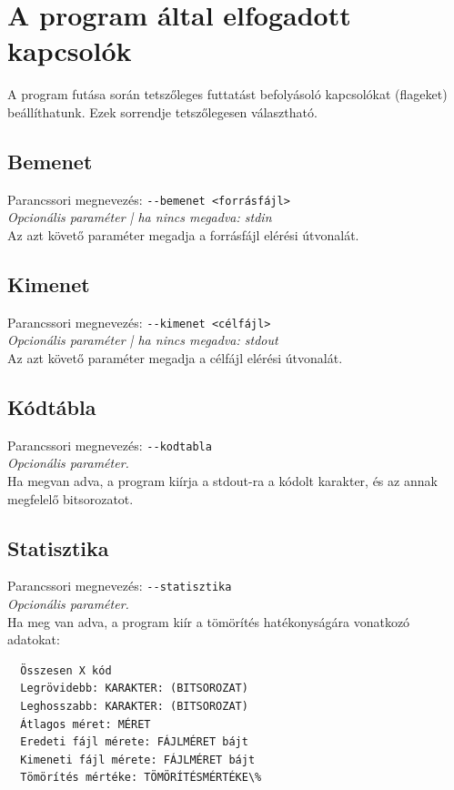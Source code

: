 \let\mypdfximage\pdfximage\def\pdfximage{\immediate\mypdfximage}\documentclass[twoside]{book}
\newcommand{\+}{\discretionary{\mbox{\scriptsize$\hookleftarrow$}}{}{}}
\begin{document}
\newpage
\section{A program által elfogadott kapcsolók}
\label{sec:flags}
A program futása során tetszőleges futtatást befolyásoló kapcsolókat (flageket) beállíthatunk.
Ezek sorrendje tetszőlegesen választható.
\subsection{Bemenet}
\label{ssec:in}
Parancssori megnevezés: \texttt{-{}-bemenet <forrásfájl>} \\
{\it Opcionális paraméter | ha nincs megadva: stdin}\\
Az azt követő paraméter megadja a forrásfájl elérési útvonalát.

\subsection{Kimenet}
\label{ssec:out}
Parancssori megnevezés: \texttt{-{}-kimenet <célfájl>} \\
{\it Opcionális paraméter | ha nincs megadva: stdout}\\
Az azt követő paraméter megadja a célfájl elérési útvonalát.

\subsection{Kódtábla}
Parancssori megnevezés: \texttt{-{}-kodtabla} \\
{\it Opcionális paraméter.}\\
Ha megvan adva, a program kiírja a stdout-ra a kódolt karakter, és az annak megfelelő bitsorozatot.

\subsection{Statisztika}
Parancssori megnevezés: \texttt{-{}-statisztika} \\
{\it Opcionális paraméter.}\\
Ha meg van adva, a program kiír a tömörítés hatékonyságára vonatkozó adatokat:
\begin{verbatim}
  Összesen X kód
  Legrövidebb: KARAKTER: (BITSOROZAT)
  Leghosszabb: KARAKTER: (BITSOROZAT)
  Átlagos méret: MÉRET
  Eredeti fájl mérete: FÁJLMÉRET bájt
  Kimeneti fájl mérete: FÁJLMÉRET bájt
  Tömörítés mértéke: TÖMÖRÍTÉSMÉRTÉKE\%
\end{verbatim}
\end{document}
